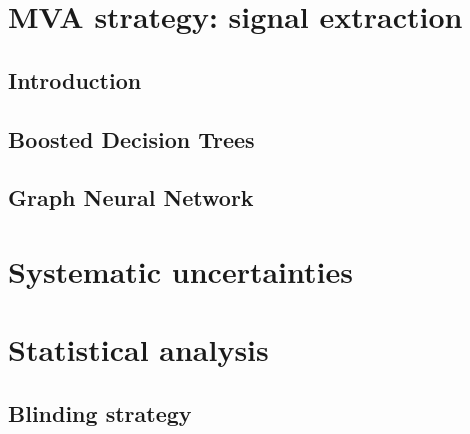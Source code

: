 \documentclass[NOTE, atlasdraft=true, texlive=2016, UKenglish]{atlasdoc}
\begin{document}
\FloatBarrier
\section{MVA strategy: signal extraction}
\label{sec:mva}
\subsection{Introduction}%
\label{sec:mva_intro}

\subsection{Boosted Decision Trees}%
\label{sec:mva_bdt}

\subsection{Graph Neural Network}%
\label{sec:mva_gnn}



\FloatBarrier
\section{Systematic uncertainties}%
\label{sec:systematics}



\FloatBarrier
\section{Statistical analysis}%
\label{sec:stats}

\subsection{Blinding strategy}%
\label{sec:blinding}

\end{document}
